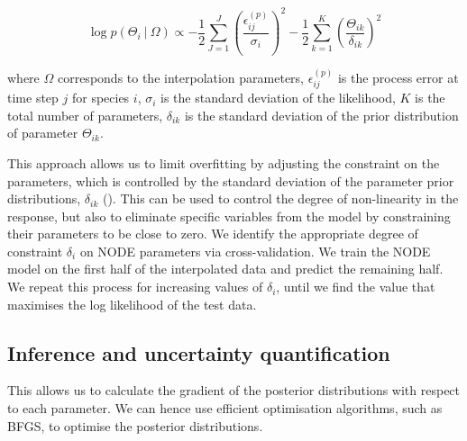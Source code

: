 \documentclass[11pt, oneside]{article}
\begin{document}
\vspace{-0.5cm}
\begin{equation}
    \log p(\Theta_i ~|~ \Omega) \propto - \frac{1}{2} \sum_{J=1}^{J} \left( \frac{\epsilon^{(p)}_{ij}}{\sigma_i} \right)^2 - \frac{1}{2} \sum_{k=1}^{K} \left( \frac{\Theta_{ik}}{\delta_{ik}} \right)^2
\end{equation}

where $\Omega$ corresponds to the interpolation parameters, 
$\epsilon^{(p)}_{ij}$ is the process error at time step $j$ for species $i$, 
$\sigma_i$ is the standard deviation of the likelihood, 
$K$ is the total number of parameters, 
$\delta_{ik}$ is the standard deviation of the prior distribution of parameter $\Theta_{ik}$.

This approach allows us to limit overfitting by adjusting the constraint on the parameters, which is controlled by the standard deviation of the parameter prior distributions, $\delta_{ik}$ (\cite{Cawley2007, Bonnaffe2021a}).
This can be used to control the degree of non-linearity in the response, but also to eliminate specific variables from the model by constraining their parameters to be close to zero.
We identify the appropriate degree of constraint $\delta_{i}$ on NODE parameters via cross-validation. 
We train the NODE model on the first half of the interpolated data and predict the remaining half.
We repeat this process for increasing values of $\delta_{i}$, until we find the value that maximises the log likelihood of the test data.

\subsection{Inference and uncertainty quantification}

This allows us to calculate the gradient of the posterior distributions with respect to each parameter.
We can hence use efficient optimisation algorithms, such as BFGS, to optimise the posterior distributions.
\end{document}
